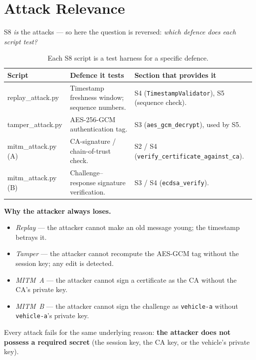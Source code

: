 \documentclass[11pt,a4paper]{report}
\begin{document}
\section{Attack Relevance}

S8 \emph{is} the attacks --- so here the question is reversed: \emph{which
defence does each script test?}

\begin{table}[h]
\centering
\small
\begin{tabular}{@{}p{3.0cm} p{4.6cm} p{4.9cm}@{}}
\toprule
\textbf{Script} & \textbf{Defence it tests} & \textbf{Section that provides it}\\
\midrule
replay\_attack.py & Timestamp freshness window; sequence numbers. & S4
(\texttt{TimestampValidator}), S5 (sequence check).\\
tamper\_attack.py & AES-256-GCM authentication tag. & S3 (\texttt{aes\_gcm\_decrypt}),
used by S5.\\
mitm\_attack.py (A) & CA-signature / chain-of-trust check. & S2 / S4
(\texttt{verify\_certificate\_against\_ca}).\\
mitm\_attack.py (B) & Challenge--response signature verification. & S3 / S4
(\texttt{ecdsa\_verify}).\\
\bottomrule
\end{tabular}
\caption{Each S8 script is a test harness for a specific defence.}
\end{table}

\noindent\textbf{Why the attacker always loses.}
\begin{itemize}
  \item \emph{Replay} --- the attacker cannot make an old message young; the
        timestamp betrays it.
  \item \emph{Tamper} --- the attacker cannot recompute the AES-GCM tag without
        the session key; any edit is detected.
  \item \emph{MITM~A} --- the attacker cannot sign a certificate as the CA
        without the CA's private key.
  \item \emph{MITM~B} --- the attacker cannot sign the challenge as
        \texttt{vehicle-a} without \texttt{vehicle-a}'s private key.
\end{itemize}
Every attack fails for the same underlying reason: \textbf{the attacker does not
possess a required secret} (the session key, the CA key, or the vehicle's
private key).
\end{document}
